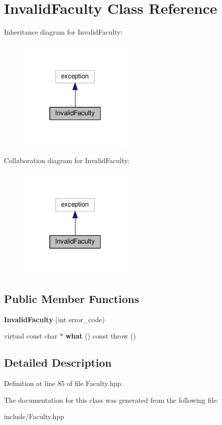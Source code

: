 \hypertarget{classInvalidFaculty}{}\section{Invalid\+Faculty Class Reference}
\label{classInvalidFaculty}


Inheritance diagram for Invalid\+Faculty\+:\nopagebreak
\begin{figure}[H]
\begin{center}
\leavevmode
\includegraphics[width=157pt]{classInvalidFaculty__inherit__graph}
\end{center}
\end{figure}


Collaboration diagram for Invalid\+Faculty\+:\nopagebreak
\begin{figure}[H]
\begin{center}
\leavevmode
\includegraphics[width=157pt]{classInvalidFaculty__coll__graph}
\end{center}
\end{figure}
\subsection*{Public Member Functions}
\begin{DoxyCompactItemize}
\item 
\mbox{\label{classInvalidFaculty_adc180b691b52cb5da0ce2a4f02e873a4}} 
{\bfseries Invalid\+Faculty} (int error\+\_\+code)
\item 
\mbox{\label{classInvalidFaculty_a11cddd616dd48218975f14a625ca3906}} 
virtual const char $\ast$ {\bfseries what} () const  throw ()
\end{DoxyCompactItemize}


\subsection{Detailed Description}


Definition at line 85 of file Faculty.\+hpp.



The documentation for this class was generated from the following file\+:\begin{DoxyCompactItemize}
\item 
include/Faculty.\+hpp\end{DoxyCompactItemize}
